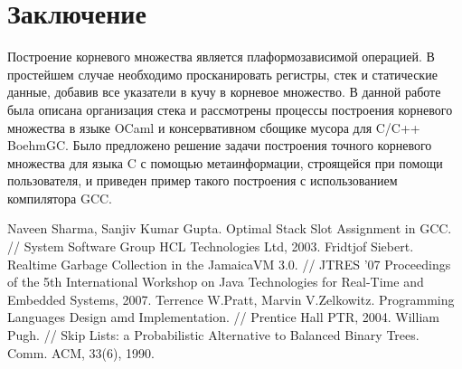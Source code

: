 \documentclass{matmex-diploma}
\begin{document}
\section*{Заключение}
Построение корневого множества является плаформозависимой операцией. В простейшем случае необходимо просканировать регистры, стек и статические данные, добавив все указатели в кучу в корневое множество. В данной работе была описана организация стека и рассмотрены процессы построения корневого множества в языке OCaml и консервативном сбощике мусора для C/C++ BoehmGC. Было предложено решение задачи построения точного корневого множества для языка C с помощью метаинформации, строящейся при помощи пользователя, и приведен пример такого построения с использованием компилятора GCC.


\begin{thebibliography}{1}
  Naveen Sharma, Sanjiv Kumar Gupta. Optimal Stack Slot Assignment in GCC. // System Software Group HCL Technologies Ltd, 2003.
  Fridtjof Siebert. Realtime Garbage Collection in the JamaicaVM 3.0. // JTRES '07 Proceedings of the 5th International Workshop on Java Technologies for Real-Time and Embedded Systems, 2007.
  Terrence W.Pratt, Marvin V.Zelkowitz. Programming Languages Design amd Implementation. // Prentice Hall PTR, 2004.
  William Pugh. // Skip Lists: a Probabilistic Alternative to Balanced Binary Trees. Comm. ACM, 33(6), 1990.
\end{thebibliography}
\end{document}

